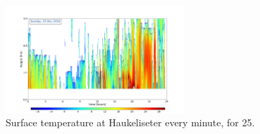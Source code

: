 \begin{figure}[H]
	\centering
	\includegraphics[width=0.6\textwidth]{./fig_MRR/MRR_20161225}
	\caption{Surface temperature at Haukeliseter every minute, for  \SI{25}{\dec}.}\label{fig:MRR_refl}
\end{figure}